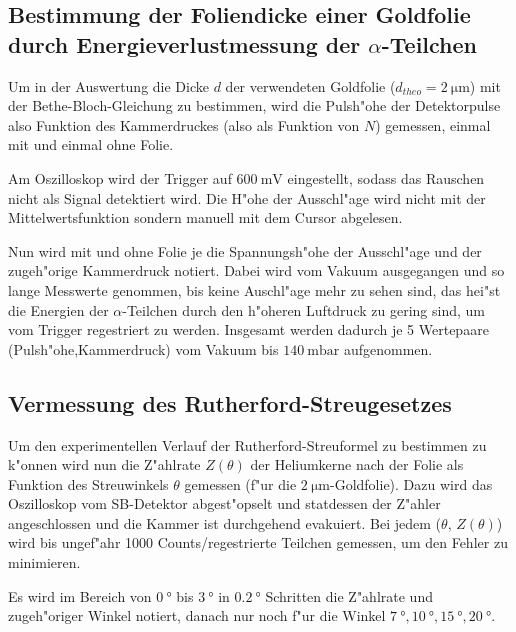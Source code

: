   \subsection{\texorpdfstring{Bestimmung der Foliendicke einer Goldfolie durch Energieverlustmessung der $\alpha$-Teilchen}{Bestimmung der Foliendicke einer Goldfolie durch Energieverlustmessung der alpha-Teilchen}}
    Um in der Auswertung die Dicke $d$ der verwendeten Goldfolie ($d_{theo}=\SI{2}{\micro \meter}$) mit der Bethe-Bloch-Gleichung zu bestimmen, wird die Pulsh"ohe der Detektorpulse also Funktion des Kammerdruckes (also als Funktion von $N$) gemessen, einmal mit und einmal ohne Folie.

    Am Oszilloskop wird der Trigger auf $\SI{600}{\milli \volt}$ eingestellt, sodass das Rauschen nicht als Signal detektiert wird.
    Die H"ohe der Ausschl"age wird nicht mit der Mittelwertsfunktion sondern manuell mit dem Cursor abgelesen.

    Nun wird mit und ohne Folie je die Spannungsh"ohe der Ausschl"age und der zugeh"orige Kammerdruck notiert.
    Dabei wird vom Vakuum ausgegangen und so lange Messwerte genommen, bis keine Auschl"age mehr zu sehen sind, das hei"st die Energien der $\alpha$-Teilchen durch den h"oheren Luftdruck zu gering sind, um vom Trigger regestriert zu werden.
    Insgesamt werden dadurch je 5 Wertepaare (Pulsh"ohe,Kammerdruck) vom Vakuum bis $\SI{140}{\milli \bar}$ aufgenommen.




  \subsection{Vermessung des Rutherford-Streugesetzes}
    Um den experimentellen Verlauf der Rutherford-Streuformel zu bestimmen zu k"onnen wird nun die Z"ahlrate $Z(\theta)$ der Heliumkerne nach der Folie als Funktion des Streuwinkels $\theta$ gemessen (f"ur die $\SI{2}{\micro \meter}$-Goldfolie).
    Dazu wird das Oszilloskop vom SB-Detektor abgest"opselt und statdessen der Z"ahler angeschlossen und die Kammer ist durchgehend evakuiert.
    Bei jedem ($\theta$, $Z(\theta)$) wird bis ungef"ahr 1000 Counts/regestrierte Teilchen gemessen, um den Fehler zu minimieren.

    Es wird im Bereich von $\SI{0}{\degree}$ bis $\SI{3}{\degree}$ in $\SI{0,2}{\degree}$ Schritten die Z"ahlrate und zugeh"origer Winkel notiert, danach nur noch f"ur die Winkel $\SI{7}{\degree},\SI{10}{\degree},\SI{15}{\degree},\SI{20}{\degree}$.


